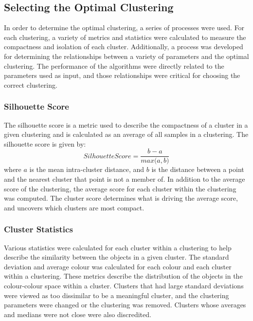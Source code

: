 \subsection{Selecting the Optimal Clustering}
In order to determine the optimal clustering, a series of processes were used.
For each clustering, a variety of metrics and statistics were calculated to measure the compactness and isolation of each cluster.
Additionally, a process was developed for determining the relationships between a variety of parameters and the optimal clustering.
The performance of the algorithms were directly related to the parameters used as input, and those relationships were critical for choosing the correct clustering.
\subsubsection{Silhouette Score}
The silhouette score is a metric used to describe the compactness of a cluster in a given clustering and is calculated as an average of all samples in a clustering.  
The silhouette score is given by:
\begin{equation}
\label{eq:ss}
Silhouette Score = \frac{b - a}{\textit{max}\big(a, b\big)}
\end{equation}
where $a$ is the mean intra-cluster distance, and $b$ is the distance between a point and the nearest cluster that point is not a member of.
In addition to the average score of the clustering, the average score for each cluster within the clustering was computed.
The cluster score determines what is driving the average score, and uncovers which clusters are most compact.

\subsubsection{Cluster Statistics}
Various statistics were calculated for each cluster within a clustering to help describe the similarity between the objects in a given cluster.
The standard deviation and average colour was calculated for each colour and each cluster within a clustering. 
These metrics describe the distribution of the objects in the colour-colour space within a cluster. 
Clusters that had large standard deviations were viewed as too dissimilar to be a meaningful cluster, and the clustering parameters were changed or the clustering was removed. 
Clusters whose averages and medians were not close were also discredited. 

